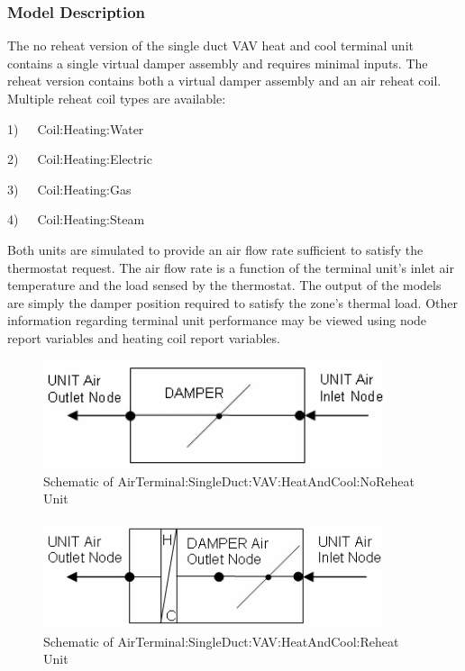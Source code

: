 \subsubsection{Model Description}\label{model-description-000}

The no reheat version of the single duct VAV heat and cool terminal unit contains a single virtual damper assembly and requires minimal inputs. The reheat version contains both a virtual damper assembly and an air reheat coil. Multiple reheat coil types are available:

1)~~~Coil:Heating:Water

2)~~~Coil:Heating:Electric

3)~~~Coil:Heating:Gas

4)~~~Coil:Heating:Steam

Both units are simulated to provide an air flow rate sufficient to satisfy the thermostat request. The air flow rate is a function of the terminal unit's inlet air temperature and the load sensed by the thermostat. The output of the models are simply the damper position required to satisfy the zone's thermal load. Other information regarding terminal unit performance may be viewed using node report variables and heating coil report variables.

\begin{figure}[hbtp] %
\centering
\includegraphics[width=0.9\textwidth, height=0.9\textheight, keepaspectratio=true]{media/image2791.png}
\caption{Schematic of AirTerminal:SingleDuct:VAV:HeatAndCool:NoReheat Unit \protect \label{fig:schematic-of-airterminal-singleduct-vav-002}}
\end{figure}

\begin{figure}[hbtp] %
\centering
\includegraphics[width=0.9\textwidth, height=0.9\textheight, keepaspectratio=true]{media/image2792.png}
\caption{Schematic of AirTerminal:SingleDuct:VAV:HeatAndCool:Reheat Unit \protect \label{fig:schematic-of-airterminal-singleduct-vav-003}}
\end{figure}


